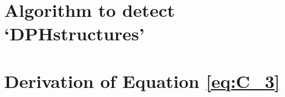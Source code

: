 \documentclass[12pt, %
english, %
singlespacing, %
2%
headsepline, %
]{MastersDoctoralThesis} %
\begin{document}
\chapter[Algorithm to detect `DPHstructures']{Algorithm to detect `DPHstructures'}
\label{appendix:DPHstructures}


\chapter[Derivation of Equation \ref{eq:C_3}]{Derivation of Equation \ref{eq:C_3}}
\label{appendix:derivation_of_C3}





\cleardoublepage
{}
{}




\end{document}
